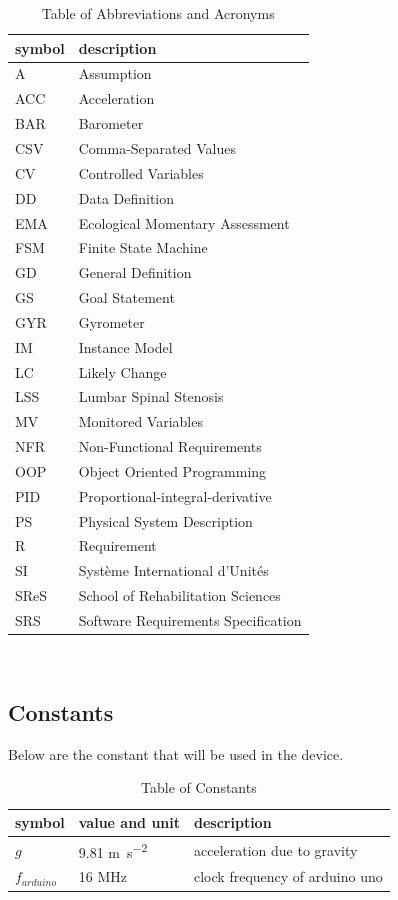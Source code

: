 \documentclass[12pt]{article}
\begin{document}
\renewcommand{\arraystretch}{1.2}
\begin{table}[H]
	\noindent\begin{tabular}{l l} 
	  \toprule		
	  \textbf{symbol} & \textbf{description}\\
	  \midrule 
	  A & Assumption\\
	  ACC & Acceleration\\
	  BAR & Barometer\\
	  CSV & Comma-Separated Values\\
	  CV & Controlled Variables\\
	  DD & Data Definition\\
	  EMA & Ecological Momentary Assessment\\
	  FSM & Finite State Machine\\
	  GD & General Definition\\
	  GS & Goal Statement\\
	  GYR & Gyrometer\\
	  IM & Instance Model\\
	  LC & Likely Change\\
	  LSS & Lumbar Spinal Stenosis\\
	  MV & Monitored Variables\\
	  NFR & Non-Functional Requirements\\
	  OOP & Object Oriented Programming\\
	  PID & Proportional-integral-derivative\\
	  PS & Physical System Description\\
	  R & Requirement\\
	  SI & Syst\`{e}me International d'Unit\'{e}s\\
	  SReS & School of Rehabilitation Sciences\\
	  SRS & Software Requirements Specification\\
	
	  \bottomrule
	\end{tabular}\\
	\caption{\label{abbacr}Table of Abbreviations and Acronyms}  
\end{table}

\subsection{Constants}
Below are the constant that will be used in the device.
\renewcommand{\arraystretch}{1.2}
\begin{table}[H]
	\noindent \begin{longtable*}{l l p{12cm}} \toprule
	
	\textbf{symbol} & \textbf{value and unit} & \textbf{description}\\
	\midrule
	$g$ & 9.81 \si{\metre\per\square\second} & acceleration due to gravity\\
	$f_{arduino}$ &16 \si{MHz} & clock frequency of arduino uno\\
	\bottomrule
	\end{longtable*}
	\caption{\label{const}Table of Constants} 
\end{table}
\end{document}
